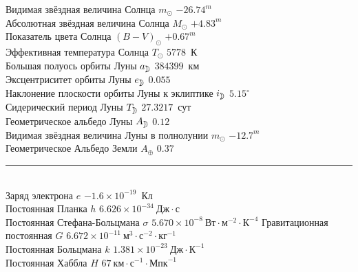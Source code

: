 Видимая звёздная величина Солнца $m_\odot$ \hfill $-26.74^m$\\
Абсолютная звёздная величина Солнца $M_\odot$ \hfill $+4.83^m$\\
Показатель цвета Солнца $(B - V)_\odot$ \hfill $+0.67^m$\\
Эффективная температура Солнца $T_\odot$ \hfill $5778$~К\\
Большая полуось орбиты Луны $a_{\moon}$ \hfill $384399$~км\\
Эксцентриситет орбиты Луны $e_{\moon}$ \hfill $0.055$\\
Наклонение плоскости орбиты Луны к эклиптике $i_{\moon}$ \hfill $5.15^\circ$\\
Сидерический период Луны $T_{\moon}$ \hfill $27.3217$~сут\\
Геометрическое альбедо Луны $A_{\moon}$ \hfill $0.12$\\
Видимая звёздная величина Луны в полнолунии $m_{\odot}$ \hfill $-12.7^m$\\
Геометрическое Альбедо Земли $A_\oplus$ \hfill $0.37$\\[-5pt]
\rule{\tw}{.7pt}\\
Заряд электрона $e$ \hfill $-1.6 \times 10^{-19}$~Кл\\
Постоянная Планка $h$ \hfill $6.626 \times 10^{-34}~\text{Дж}\cdot\text{с}$\\
Постоянная Стефана-Больцмана $\sigma$ \hfill $5.670 \times 10^{-8}~\text{Вт} \cdot \text{м}^{-2} \cdot \text{К}^{-4}$
Гравитационная постоянная $G$ \hfill $6.672 \times 10^{-11}~\text{м}^3 \cdot \text{с}^{-2} \cdot \text{кг}^{-1}$\\
Постоянная Больцмана $k$ \hfill $1.381 \times 10^{-23}~\text{Дж} \cdot \text{К}^{-1}$\\
Постоянная Хаббла $H$ \hfill $67~\text{км} \cdot \text{с}^{-1} \cdot \text{Мпк}^{-1}$

